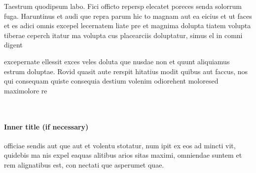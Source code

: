 \documentclass[final,a0paper]{ivtposter}
\begin{document}
\begin{poster}
{    Taestrum quodipsum labo. Fici officto repersp elecatet poreces senda solorrum fuga. Haruntinus et audi que
    repra parum hic to magnam aut ea eicius et ut faces et es adici omnis excepel lecernatem liate pre et magnima
    dolupta tiatem volupta tiberae ceperch itatur ma volupta cus placearciis doluptatur, simus el in comni digent

    excepernate ellessit exces veles doluta que nusdae non et quunt aliquiamus estrum doluptae. Rovid quasit
    aute rerspit hitatius modit quibus aut faccus, nos qui consequam quiste consequia destium volenim odiorehent
    moloresed maximolore re

    ~

    \paragraph{Inner title (if necessary)}
    officiae sendis aut que aut et volentu stotatur, num ipit ex eos ad mincti vit, quidebis ma nis expel eaquas alitibus arios sitas maximi, omniendae suntem et rem alignatibus est, con nectati que asperumet quae.
  }

\end{poster}
\end{document}
